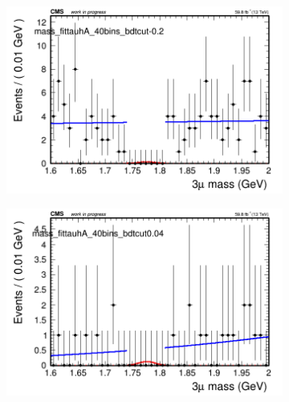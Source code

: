 \begin{figure}[H]
\begin{subfigure}{0.2\textwidth}
        \caption{}
    \end{subfigure}
    \begin{subfigure}{0.2\textwidth}
        \includegraphics[width=\textwidth]{power_law/plots/tauhA/massfit_tauhA_40bins_bdtcut-0.2.png}
        \caption{}
    \end{subfigure}
    \begin{subfigure}{0.2\textwidth}
        \includegraphics[width=\textwidth]{power_law/plots/tauhA/massfit_tauhA_40bins_bdtcut0.04.png}
        \caption{}
    \end{subfigure}
    \begin{subfigure}{0.2\textwidth}

\end{subfigure}
\end{figure}
